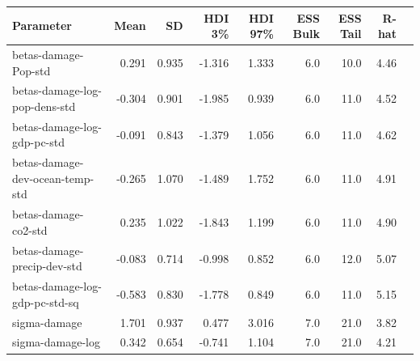 \begin{table}[htbp]
\centering
{}
\label{tab:damage_sum_table}
\footnotesize
\begin{tabular}{lrrrrrrrr}
\toprule
\textbf{Parameter} & \textbf{Mean} & \textbf{SD} & \textbf{HDI 3\%} & \textbf{HDI 97\%} & \textbf{ESS Bulk} & \textbf{ESS Tail} & \textbf{R-hat} \\
\midrule
betas-damage-Pop-std & 0.291 & 0.935 & -1.316 & 1.333 & 6.0 & 10.0 & 4.46 \\
betas-damage-log-pop-dens-std & -0.304 & 0.901 & -1.985 & 0.939 & 6.0 & 11.0 & 4.52 \\
betas-damage-log-gdp-pc-std & -0.091 & 0.843 & -1.379 & 1.056 & 6.0 & 11.0 & 4.62 \\
betas-damage-dev-ocean-temp-std & -0.265 & 1.070 & -1.489 & 1.752 & 6.0 & 11.0 & 4.91 \\
betas-damage-co2-std & 0.235 & 1.022 & -1.843 & 1.199 & 6.0 & 11.0 & 4.90 \\
betas-damage-precip-dev-std & -0.083 & 0.714 & -0.998 & 0.852 & 6.0 & 12.0 & 5.07 \\
betas-damage-log-gdp-pc-std-sq & -0.583 & 0.830 & -1.778 & 0.849 & 6.0 & 11.0 & 5.15 \\
sigma-damage & 1.701 & 0.937 & 0.477 & 3.016 & 7.0 & 21.0 & 3.82 \\
sigma-damage-log & 0.342 & 0.654 & -0.741 & 1.104 & 7.0 & 21.0 & 4.21 \\
\bottomrule
\end{tabular}
\end{table}
